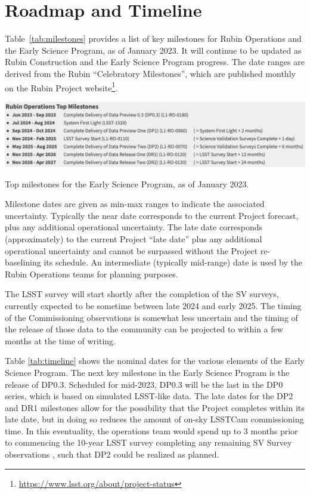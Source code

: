 \section{Roadmap and Timeline} \label{sec:timeline}

Table~\ref{tab:milestones} provides a list of key milestones for Rubin Operations and the Early Science Program, as of January 2023.
It will continue to be updated as Rubin Construction and the Early Science Program progress. 
The date ranges are derived from the Rubin ``Celebratory Milestones'', which are  published monthly on the Rubin Project website\footnote{\url{https://www.lsst.org/about/project-status}}. 

\begin{table}[htb]
\label{tab:milestones}
\includegraphics[width=\linewidth]{figures/DPR-milestones}
\caption{Top milestones for the Early Science Program, as of January 2023.}
\end{table}

Milestone dates are given as min-max ranges to indicate the associated uncertainty. 
Typically the near date corresponds to the current Project forecast, plus any additional operational uncertainty.
The late date corresponds (approximately) to the current Project ``late date'' plus any additional operational uncertainty and cannot be surpassed without the Project re-baselining its schedule.
An intermediate (typically mid-range) date is used by the Rubin Operations teams for planning purposes. 

The LSST survey will start shortly after the completion of the SV surveys, currently expected to be sometime between late 2024 and early 2025.
The timing of the Commissioning observations is somewhat less uncertain and the timing of the release of those data to the community can be projected to within a few months at the time of writing.

Table \ref{tab:timeline} shows the nominal  dates for the various elements of the Early Science Program. 
The next key milestone in the Early Science Program is the release of DP0.3. 
Scheduled for mid-2023, DP0.3 will be the last in the DP0 series, which is based on simulated LSST-like data. 
The late dates for the DP2 and DR1 milestones allow for the possibility that the Project completes within its late date, but in doing so reduces the amount of on-sky LSSTCam commissioning time.
In this eventuality, the operations team would spend up to 3 months prior to commencing the 10-year LSST survey completing any remaining SV Survey observations , such that DP2 could be realized as planned.

